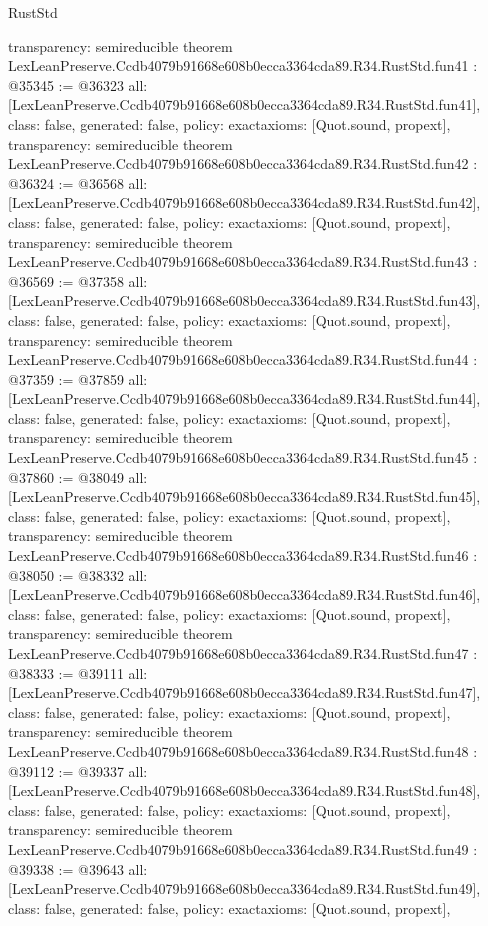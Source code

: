 \begin{lexlean}{RustStd}
\begin{coremodule}
{  transparency: semireducible
}
theorem LexLeanPreserve.Ccdb4079b91668e608b0ecca3364cda89.R34.RustStd.fun41 : @35345 := @36323 {
  all: [LexLeanPreserve.Ccdb4079b91668e608b0ecca3364cda89.R34.RustStd.fun41],
  class: false,
  generated: false,
  policy: exact{axioms: [Quot.sound, propext]},
  transparency: semireducible
}
theorem LexLeanPreserve.Ccdb4079b91668e608b0ecca3364cda89.R34.RustStd.fun42 : @36324 := @36568 {
  all: [LexLeanPreserve.Ccdb4079b91668e608b0ecca3364cda89.R34.RustStd.fun42],
  class: false,
  generated: false,
  policy: exact{axioms: [Quot.sound, propext]},
  transparency: semireducible
}
theorem LexLeanPreserve.Ccdb4079b91668e608b0ecca3364cda89.R34.RustStd.fun43 : @36569 := @37358 {
  all: [LexLeanPreserve.Ccdb4079b91668e608b0ecca3364cda89.R34.RustStd.fun43],
  class: false,
  generated: false,
  policy: exact{axioms: [Quot.sound, propext]},
  transparency: semireducible
}
theorem LexLeanPreserve.Ccdb4079b91668e608b0ecca3364cda89.R34.RustStd.fun44 : @37359 := @37859 {
  all: [LexLeanPreserve.Ccdb4079b91668e608b0ecca3364cda89.R34.RustStd.fun44],
  class: false,
  generated: false,
  policy: exact{axioms: [Quot.sound, propext]},
  transparency: semireducible
}
theorem LexLeanPreserve.Ccdb4079b91668e608b0ecca3364cda89.R34.RustStd.fun45 : @37860 := @38049 {
  all: [LexLeanPreserve.Ccdb4079b91668e608b0ecca3364cda89.R34.RustStd.fun45],
  class: false,
  generated: false,
  policy: exact{axioms: [Quot.sound, propext]},
  transparency: semireducible
}
theorem LexLeanPreserve.Ccdb4079b91668e608b0ecca3364cda89.R34.RustStd.fun46 : @38050 := @38332 {
  all: [LexLeanPreserve.Ccdb4079b91668e608b0ecca3364cda89.R34.RustStd.fun46],
  class: false,
  generated: false,
  policy: exact{axioms: [Quot.sound, propext]},
  transparency: semireducible
}
theorem LexLeanPreserve.Ccdb4079b91668e608b0ecca3364cda89.R34.RustStd.fun47 : @38333 := @39111 {
  all: [LexLeanPreserve.Ccdb4079b91668e608b0ecca3364cda89.R34.RustStd.fun47],
  class: false,
  generated: false,
  policy: exact{axioms: [Quot.sound, propext]},
  transparency: semireducible
}
theorem LexLeanPreserve.Ccdb4079b91668e608b0ecca3364cda89.R34.RustStd.fun48 : @39112 := @39337 {
  all: [LexLeanPreserve.Ccdb4079b91668e608b0ecca3364cda89.R34.RustStd.fun48],
  class: false,
  generated: false,
  policy: exact{axioms: [Quot.sound, propext]},
  transparency: semireducible
}
theorem LexLeanPreserve.Ccdb4079b91668e608b0ecca3364cda89.R34.RustStd.fun49 : @39338 := @39643 {
  all: [LexLeanPreserve.Ccdb4079b91668e608b0ecca3364cda89.R34.RustStd.fun49],
  class: false,
  generated: false,
  policy: exact{axioms: [Quot.sound, propext]},
}
\end{coremodule}
\end{lexlean}
